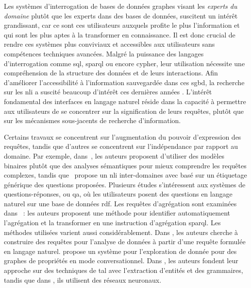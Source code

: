 Les systèmes d'interrogation de bases de données graphes visant les \emph{experts du domaine} plutôt que les experts dans des bases de données, suscitent un intérêt grandissant, car ce sont ces utilisateurs auxquels profite le plus l'information et qui sont les plus aptes à la transformer en connaissance.
Il est donc crucial de rendre ces systèmes plus conviviaux et accessibles aux utilisateurs sans compétences techniques avancées.
Malgré la puissance des langages d'interrogation comme \acrshort{sql}, \acrshort{sparql} ou encore \gls{cypher}, leur utilisation nécessite une compréhension de la structure des données et de leurs interactions.
Afin d'améliorer l'accessibilité à l'information sauvegardée dans ces \gls{sgbd}, la recherche sur les \gls{nli} a suscité beaucoup d'intérêt ces dernières années \cite{zhengQuestionAnsweringKnowledge2018,wangCrossdomainNaturalLanguage2019,xuMirrorNaturalLanguage2023,vargas-solarTranslatingDataScience2023,vargas-solarConversationalDataExploration2023}.
L'intérêt fondamental des interfaces en langage naturel réside dans la capacité à permettre aux utilisateurs de se concentrer sur la signification de leurs requêtes, plutôt que sur les mécanismes sous-jacents de recherche d'information.

Certains travaux se concentrent sur l'augmentation du pouvoir d'expression des requêtes, tandis que d'autres se concentrent sur l'indépendance par rapport au domaine.
Par exemple, dans~\cite{zhengQuestionAnsweringKnowledge2018}, les auteurs proposent d'utiliser des modèles binaires plutôt que des analyses sémantiques pour mieux comprendre les requêtes complexes, tandis que~\cite{wangCrossdomainNaturalLanguage2019} propose un \gls{nli} inter-domaines avec basé sur un étiquetage générique des questions proposées.
Plusieurs études \cite{zouNaturalLanguageQuestion2014,faderOpenQuestionAnswering2014,amsterdamerNaturalLanguageInterface2015} s'intéressent aux systèmes de questions-réponses, ou \gls{qa}, où les utilisateurs posent des questions en langage naturel sur une base de données \acrshort{rdf}.
Les requêtes d'agrégation sont examinées dans~\cite{huNaturalLanguageAggregate2018} : les auteurs proposent une méthode pour identifier automatiquement l'agrégation et la transformer en une instruction d'agrégation \acrshort{sparql}.
Les méthodes utilisées varient aussi considérablement.
Dans \cite{vargas-solarTranslatingDataScience2023}, les auteurs cherche à construire des requêtes pour l'analyse de données à partir d'une requête formulée en langage naturel.
\cite{vargas-solarConversationalDataExploration2023} propose un système pour l'exploration de donnée pour des graphes de propriétés en mode conversationnel.
Dans \cite{zafarFormalQueryGeneration2018,zhengQuestionAnsweringKnowledge2018,steinmetzNaturalLanguageQuestions2019}, les auteurs fondent leur approche sur des techniques de \gls{tal} avec l'extraction d'entités et des grammaires, tandis que dans \cite{utamaEndtoendNeuralNatural2018,wangCrossdomainNaturalLanguage2019}, ils utilisent des réseaux neuronaux.

